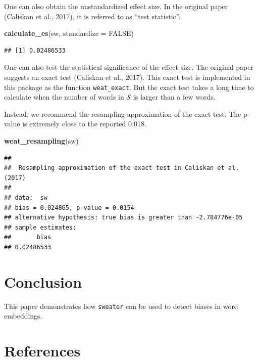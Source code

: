 \documentclass[english,man]{apa6}
\newenvironment{Shaded}{\begin{snugshade}}{\end{snugshade}}
\newcommand{\DataTypeTok}[1]{\textcolor[rgb]{0.13,0.29,0.53}{#1}}
\newcommand{\KeywordTok}[1]{\textcolor[rgb]{0.13,0.29,0.53}{\textbf{#1}}}
\newcommand{\NormalTok}[1]{#1}
\newcommand{\OtherTok}[1]{\textcolor[rgb]{0.56,0.35,0.01}{#1}}
\begin{document}
One can also obtain the unstandardized effect size. In the original paper (Caliskan et al., 2017), it is referred to as \enquote{test statistic}.

\begin{Shaded}
\begin{Highlighting}[]
\KeywordTok{calculate_es}\NormalTok{(sw, }\DataTypeTok{standardize =} \OtherTok{FALSE}\NormalTok{)}
\end{Highlighting}
\end{Shaded}

\begin{verbatim}
## [1] 0.02486533
\end{verbatim}

One can also test the statistical significance of the effect size. The original paper suggests an exact test (Caliskan et al., 2017). This exact test is implemented in this package as the function \texttt{weat\_exact}. But the exact test takes a long time to calculate when the number of words in \(\mathcal{S}\) is larger than a few words.

Instead, we recommend the resampling approximation of the exact test. The p-value is extremely close to the reported 0.018.

\begin{Shaded}
\begin{Highlighting}[]
\KeywordTok{weat_resampling}\NormalTok{(sw)}
\end{Highlighting}
\end{Shaded}

\begin{verbatim}
## 
##  Resampling approximation of the exact test in Caliskan et al. (2017)
## 
## data:  sw
## bias = 0.024865, p-value = 0.0154
## alternative hypothesis: true bias is greater than -2.784776e-05
## sample estimates:
##       bias 
## 0.02486533
\end{verbatim}

\hypertarget{conclusion}{%
\section{Conclusion}\label{conclusion}}

This paper demonstrates how \texttt{sweater} can be used to detect biases in word embeddings.

\newpage

\hypertarget{references}{%
\section{References}\label{references}}
\end{document}
